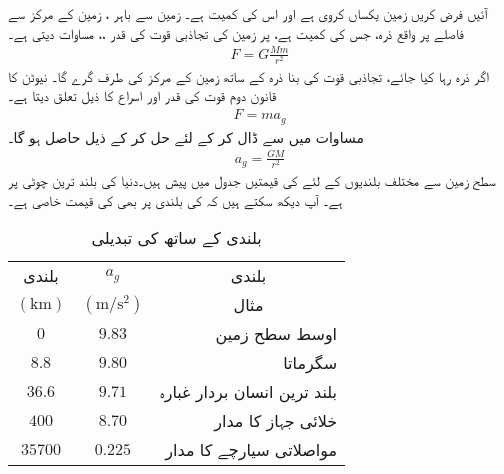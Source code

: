 آئیں فرض کریں زمین  یکساں  کروی ہے اور اس کی کمیت  ہے۔ زمین سے باہر ، زمین کے مرکز سے  فاصلے پر واقع ذرہ، جس کی کمیت  ہے، پر زمین کی تجاذبی قوت کی قدر   ،، مساوات  دیتی ہے۔
\begin{align}\label{مساوات_تجاذب_قوت_زمین}
F=G\frac{Mm}{r^2}
\end{align}
اگر ذرہ رہا  کیا جائے، تجاذبی قوت  کی بنا ذرہ   کے ساتھ زمین  کے مرکز  کی طرف  گرے گا۔ نیوٹن کا قانون دوم  قوت کی قدر  اور اسراع  کا ذیل  تعلق دیتا ہے۔
\begin{align}\label{مساوات_تجاذب_قوت_زمین_ب}
F=ma_g
\end{align}
مساوات  میں    سے  ڈال کر  کے لئے حل کر کے ذیل حاصل ہو گا۔
\begin{align}\label{مساوات_تجاذب_حساب_اسراع}
a_g=\frac{GM}{r^2}
\end{align}
سطح زمین سے مختلف بلندیوں کے لئے  کی قیمتیں جدول  میں  پیش ہیں۔دنیا کی بلند ترین چوٹی  پر  ہے۔ آپ دیکھ سکتے ہیں  کہ  کی بلندی پر بھی  کی قیمت خاصی ہے۔
\begin{table}
\caption{بلندی کے ساتھ  کی تبدیلی}
\label{جدول_تجاذب_بلندی_اور_اسراع}
\centering
\begin{tabular}{ccr}
\toprule
بلندی& \(a_g\) &  \multicolumn{1}{c}{بلندی}\\
\((\si{\kilo\meter})\)&\((\si{\meter\per\second\squared})\)& \multicolumn{1}{c}{مثال}\\
\midrule
\(0\)& \(9.83\) & اوسط سطح زمین\\
\(8.8\)& \(9.80\) & سگرماتا\\
\(36.6\)& \(9.71\) & بلند ترین انسان بردار  غبارہ\\
\(400\)& \(8.70\) & خلائی جہاز کا مدار\\
\(35700\)& \(0.225\) & مواصلاتی سیارچے  کا مدار\\
\bottomrule
\end{tabular}
\end{table}

